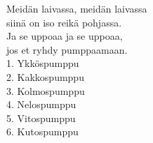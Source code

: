 
            Meidän laivassa, meidän laivassa \\
            siinä on iso reikä pohjassa. \\
            Ja se uppoaa ja se uppoaa, \\
            jos et ryhdy pumppaamaan. \\
            1. Ykköspumppu \\
            2. Kakkospumppu \\
            3. Kolmospumppu \\
            4. Nelospumppu \\
            5. Vitospumppu \\
            6. Kutospumppu \\

